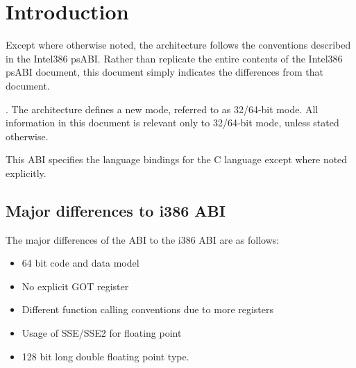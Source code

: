
\chapter{Introduction}

Except where otherwise noted, the \xARCH architecture follows the
conventions described in the Intel386 psABI.  Rather than replicate
the entire contents of the Intel386 psABI document, this document
simply indicates the differences from that document.

.
The \xARCH architecture defines a new mode, referred to as 32/64-bit
mode. All information in this document is relevant only to 32/64-bit
mode, unless stated otherwise.

This ABI specifies the language bindings for the C language except
where noted explicitly.

\section{Major differences to i386 ABI}

The major differences of the \xARCH ABI to the i386 ABI are as
follows:
\begin{itemize}
\item 64 bit code and data model
\item No explicit GOT register
\item Different function calling conventions due to more registers
\item Usage of SSE/SSE2 for floating point
\item 128 bit long double floating point type. 
\end{itemize}

